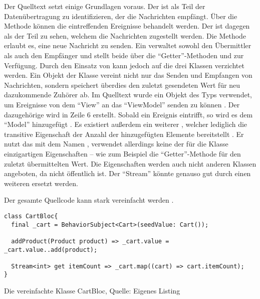 Der Quelltext setzt einige Grundlagen voraus.
Der  ist als Teil der Datenübertragung zu identifizieren,
der die Nachrichten empfängt.
Über die Methode  können die eintreffenden Ereignisse behandelt werden.
Der  ist dagegen als der Teil zu sehen,
welchem die Nachrichten zugestellt werden.
Die Methode  erlaubt es,
eine neue Nachricht zu senden.
Ein  verwaltet sowohl den Übermittler als auch den Empfänger
und stellt beide über die \enquote{Getter}-Methoden  und  zur Verfügung.
Durch den Einsatz von  kann jedoch auf die drei Klassen verzichtet werden.
Ein Objekt der Klasse  vereint nicht nur das Senden und Empfangen von Nachrichten,
sondern speichert überdies den zuletzt gesendeten Wert für neu dazukommende Zuhörer ab.
Im Quelltext wurde ein Objekt des Typs  verwendet,
um Ereignisse von dem \enquote{View} an das \enquote{ViewModel} senden zu können .
Der dazugehörige  wird in Zeile 6 erstellt.
Sobald ein Ereignis eintrifft,
so wird es dem \enquote{Model}  hinzugefügt .
Es existiert außerdem ein weiterer  ,
 welcher lediglich die transitive Eigenschaft der Anzahl der hinzugefügten Elemente bereitstellt .
Er nutzt das  mit dem Namen  ,
verwendet allerdings keine der für die Klasse einzigartigen Eigenschaften
-- wie zum Beispiel die \enquote{Getter}-Methode  für den zuletzt übermittelten Wert.
Die Eigenschaften werden auch nicht anderen Klassen angeboten, da  nicht öffentlich ist.
Der \enquote{Stream}  könnte genauso gut durch einen weiteren  ersetzt werden.

Der gesamte Quellcode kann stark vereinfacht werden \Lst{\ref{lst:CartBlocVereinfacht}}.
\ifIncludeFigures
  \begin{listing}[h]
    \begin{verbatim}
class CartBloc{
  final _cart = BehaviorSubject<Cart>(seedValue: Cart());

  addProduct(Product product) => _cart.value = _cart.value..add(product);

  Stream<int> get itemCount => _cart.map((cart) => cart.itemCount);
}
\end{verbatim}
    \caption[Die vereinfachte Klasse CartBloc]{Die vereinfachte Klasse CartBloc, Quelle: Eigenes Listing}
    \label{lst:CartBlocVereinfacht}
  \end{listing}
\fi

